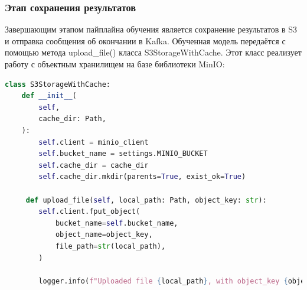 \subsubsection{Этап сохранения результатов}
Завершающим этапом пайплайна обучения является сохранение результатов в S3 и отправка сообщения об окончании в Kafka. Обученная модель передаётся с помощью метода upload\_file() класса S3StorageWithCache. Этот класс реализует работу с объектным хранилищем на базе библиотеки MinIO:
\begin{lstlisting}[language=Python, numbers=none, frame=none]
class S3StorageWithCache:
    def __init__(
        self,
        cache_dir: Path,
    ):
        self.client = minio_client
        self.bucket_name = settings.MINIO_BUCKET
        self.cache_dir = cache_dir
        self.cache_dir.mkdir(parents=True, exist_ok=True)

     def upload_file(self, local_path: Path, object_key: str):
        self.client.fput_object(
            bucket_name=self.bucket_name,
            object_name=object_key,
            file_path=str(local_path),
        )

        logger.info(f"Uploaded file {local_path}, with object_key {object_key}")
\end{lstlisting}